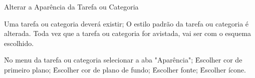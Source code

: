 \begin{funcionalidade}{Alterar a Aparência da Tarefa ou Categoria}



	\condicao
	{Uma tarefa ou categoria deverá existir;} %
	{O estilo padrão da tarefa ou categoria é alterada. Toda vez que a tarefa ou categoria for avistada, vai ser com o esquema escolhido.} %

	\begin{fluxo}
		\f No menu da tarefa ou categoria selecionar a aba "Aparência";
			\subf
			\f Escolher cor de primeiro plano;
			\f Escolher cor de plano de fundo;
			\f Escolher fonte;
			\f Escolher ícone.
			\voltaf
	\end{fluxo}


\end{funcionalidade}
